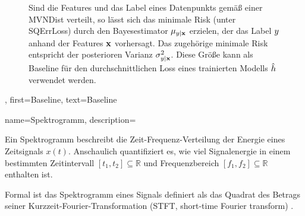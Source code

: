 {{{{{{		\begin{figure}[H]
			\begin{center}
			\end{center}
			\caption{Sind die \gls{Features} und das \gls{Label} eines \gls{Datenpunkts} gemäß einer \gls{MVNDist} verteilt, so lässt sich das minimale \gls{Risk} (unter \gls{SQErrLoss}) durch den \gls{Bayesestimator} $\mu_{y|{\bf x}}$ erzielen, der das \gls{Label} $y$ anhand der \gls{Features} ${\bf x}$ vorhersagt. Das zugehörige minimale \gls{Risk} entspricht der posterioren Varianz $\sigma^{2}_{y|{\bf x}}$. Diese Größe kann als Baseline für den durchschnittlichen \gls{Loss} eines trainierten \gls{Modells} $\hat{h}$ verwendet werden.\label{fig_post_baseline_dict}}
		\end{figure}
	},
	first={Baseline},
	text={Baseline}
}

{
	name={Spektrogramm},
	description={
		Ein Spektrogramm beschreibt die Zeit-Frequenz-Verteilung der Energie eines Zeitsignals $x(t)$. Anschaulich quantifiziert es, wie viel Signalenergie in einem bestimmten Zeitintervall 
		$[t_{1}, t_{2}] \subseteq \mathbb{R}$ und Frequenzbereich $[f_{1}, f_{2}] \subseteq \mathbb{R}$ enthalten ist. 
		
		Formal ist das Spektrogramm eines Signals definiert als das Quadrat des Betrags seiner Kurzzeit-Fourier-Transformation (STFT, short-time Fourier transform) \cite{cohen1995time}.
		
}}}}}}
